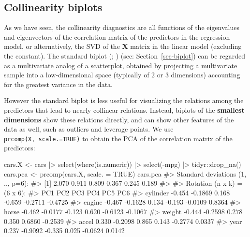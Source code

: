 \documentclass[
  letterpaper,
  10pt,
  krantz2]{krantz}
\makeatletter
\newenvironment{Shaded}{\begin{snugshade}}{\end{snugshade}}
\newcommand{\AttributeTok}[1]{\textcolor[rgb]{0.40,0.45,0.13}{#1}}
\newcommand{\CommentTok}[1]{\textcolor[rgb]{0.37,0.37,0.37}{#1}}
\newcommand{\ConstantTok}[1]{\textcolor[rgb]{0.56,0.35,0.01}{#1}}
\newcommand{\FunctionTok}[1]{\textcolor[rgb]{0.28,0.35,0.67}{#1}}
\newcommand{\NormalTok}[1]{\textcolor[rgb]{0.00,0.23,0.31}{#1}}
\newcommand{\OtherTok}[1]{\textcolor[rgb]{0.00,0.23,0.31}{#1}}
\newcommand{\SpecialCharTok}[1]{\textcolor[rgb]{0.37,0.37,0.37}{#1}}
\newenvironment{kframe}{%
  \medskip{}
  \setlength{\fboxsep}{.8em}
  \def\at@end@of@kframe{}%
  \ifinner\ifhmode%
  \def\at@end@of@kframe{\end{minipage}}%
  \begin{minipage}{\columnwidth}%
  \fi\fi%
  \def\FrameCommand##1{\hskip\@totalleftmargin \hskip-\fboxsep
  \colorbox{shadecolor}{##1}\hskip-\fboxsep
      \hskip-\linewidth \hskip-\@totalleftmargin \hskip\columnwidth}%
  \MakeFramed {\advance\hsize-\width
    \@totalleftmargin\z@ \linewidth\hsize
    \@setminipage}}%
{\par\unskip\endMakeFramed%
  \at@end@of@kframe}
\renewenvironment{Shaded}{\begin{kframe}}{\end{kframe}}
\makeatother
\begin{document}
\subsection{Collinearity biplots}\label{collinearity-biplots}

As we have seen, the collinearity diagnostics are all functions of the
eigenvalues and eigenvectors of the correlation matrix of the predictors
in the regression model, or alternatively, the SVD of the \(\mathbf{X}\)
matrix in the linear model (excluding the constant). The standard biplot
(;
) (see:
Section~\ref{sec-biplot}) can be regarded as a multivariate analog of a
scatterplot, obtained by projecting a multivariate sample into a
low-dimensional space (typically of 2 or 3 dimensions) accounting for
the greatest variance in the data.

However the standard biplot is less useful for visualizing the relations
among the predictors that lead to nearly collinear relations. Instead,
biplots of the \textbf{smallest dimensions} show these relations
directly, and can show other features of the data as well, such as
outliers and leverage points. We use \texttt{prcomp(X,\ scale.=TRUE)} to
obtain the PCA of the correlation matrix of the predictors:

\begin{Shaded}
\begin{Highlighting}[]
\NormalTok{cars.X }\OtherTok{\textless{}{-}}\NormalTok{ cars }\SpecialCharTok{|\textgreater{}}
  \FunctionTok{select}\NormalTok{(}\FunctionTok{where}\NormalTok{(is.numeric)) }\SpecialCharTok{|\textgreater{}}
  \FunctionTok{select}\NormalTok{(}\SpecialCharTok{{-}}\NormalTok{mpg) }\SpecialCharTok{|\textgreater{}}
\NormalTok{  tidyr}\SpecialCharTok{::}\FunctionTok{drop\_na}\NormalTok{()}
\NormalTok{cars.pca }\OtherTok{\textless{}{-}} \FunctionTok{prcomp}\NormalTok{(cars.X, }\AttributeTok{scale. =} \ConstantTok{TRUE}\NormalTok{)}
\NormalTok{cars.pca}
\CommentTok{\#\textgreater{} Standard deviations (1, .., p=6):}
\CommentTok{\#\textgreater{} [1] 2.070 0.911 0.809 0.367 0.245 0.189}
\CommentTok{\#\textgreater{} }
\CommentTok{\#\textgreater{} Rotation (n x k) = (6 x 6):}
\CommentTok{\#\textgreater{}             PC1     PC2    PC3    PC4     PC5     PC6}
\CommentTok{\#\textgreater{} cylinder {-}0.454 {-}0.1869  0.168 {-}0.659 {-}0.2711 {-}0.4725}
\CommentTok{\#\textgreater{} engine   {-}0.467 {-}0.1628  0.134 {-}0.193 {-}0.0109  0.8364}
\CommentTok{\#\textgreater{} horse    {-}0.462 {-}0.0177 {-}0.123  0.620 {-}0.6123 {-}0.1067}
\CommentTok{\#\textgreater{} weight   {-}0.444 {-}0.2598  0.278  0.350  0.6860 {-}0.2539}
\CommentTok{\#\textgreater{} accel     0.330 {-}0.2098  0.865  0.143 {-}0.2774  0.0337}
\CommentTok{\#\textgreater{} year      0.237 {-}0.9092 {-}0.335  0.025 {-}0.0624  0.0142}
\end{Highlighting}
\end{Shaded}
\end{document}
